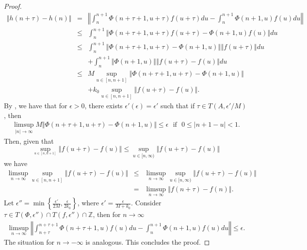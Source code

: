 \documentclass[english,,reqno]{amsart}
\numberwithin{equation}{section}
\theoremstyle{plain}
\theoremstyle{definition}
\theoremstyle{remark}
\begin{document}
\begin{proof}
\begin{eqnarray*}
\left\Vert h(n+\tau)-h(n)\right\Vert & = & \left\Vert \int_{n}^{n+1}\Phi(n+\tau+1,u+\tau)f(u+\tau)du-\int_{n}^{n+1}\Phi(n+1,u)f(u)du\right\Vert\\
 & \leq & \int_{n}^{n+1}\left\Vert\Phi(n+\tau+1,u+\tau)f(u+\tau)-\Phi(n+1,u)f(u)\right\Vert du\\
 & \leq & \int_{n}^{n+1}\left\Vert \Phi(n+\tau+1,u+\tau)-\Phi(n+1,u)\right\Vert \left\Vert f(u+\tau)\right\Vert du\\
 &  & +\int_{n}^{n+1}\left\Vert \Phi(n+1,u)\right\Vert \left\Vert f(u+\tau)-f(u)\right\Vert du\\
 & \leq & M\sup_{u\in[n,n+1]}\left\Vert \Phi(n+\tau+1,u+\tau)-\Phi(n+1,u)\right\Vert\\
 &  & +k_{0}\sup_{u\in[n,n+1]}\left\Vert f(u+\tau)-f(u)\right\Vert.
\end{eqnarray*}
By \cite[Theorem 2]{pinto_remotely}, we have that for $\epsilon > 0$, there exists $\epsilon'(\epsilon) = \epsilon'$ such that if $\tau \in T(A, \epsilon'/M)$, then
\begin{eqnarray*}
\limsup_{\vert n \vert\rightarrow \infty} M\Vert \Phi(n+\tau+1, u+\tau)-\Phi(n+1,u) \Vert\leq \epsilon \,\,\,\,\mathrm{ if }\,\,\,\, 0\leq \vert n+1-u\vert <1.
\end{eqnarray*}
Then, given that
$$\sup_{_{u\in[n,n+1]}} \left\Vert f(u+\tau)-f(u)\right\Vert \leq \sup_{u\in[n,\infty)} \left\Vert f(u+\tau)-f(u)\right\Vert$$
we have
\begin{eqnarray*}
\limsup_{ n \rightarrow \infty}\sup_{u\in[n,n+1]}\left\Vert f(u+\tau)-f(u)\right\Vert &\leq&  \limsup_{ n \rightarrow \infty}\sup_{u\in[n,\infty)}\left\Vert f(u+\tau)-f(u)\right\Vert\\
&=& \limsup_{n \rightarrow \infty} \left\Vert f(n+\tau)-f(n)\right\Vert.
\end{eqnarray*}
Let $\epsilon'' = \min\left\{ \frac{\epsilon'}{2M}, \frac{\epsilon}{2k_0} \right\}$, where $\epsilon' = \frac{\epsilon}{M + k_0}$.  
Consider $\tau \in T(\Phi, \epsilon'') \cap T(f, \epsilon'') \cap \mathbb{Z}$, then for $n\rightarrow\infty$
\begin{eqnarray*}
\limsup_{ n\rightarrow\infty}\left\Vert \int_{n+\tau}^{n+\tau+1}\Phi(n+\tau+1,u)f(u)du-\int_{n}^{n+1}\Phi(n+1,u)f(u)du\right\Vert \leq \epsilon.
\end{eqnarray*}
The situation for $n \rightarrow -\infty$ is analogous.  
This concludes the proof.
\end{proof}
\end{document}
